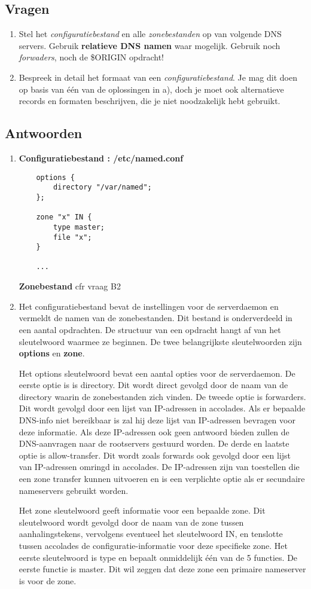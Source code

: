 \documentclass{report}
\begin{document}
\subsection{Vragen}
\begin{enumerate}
\item Stel het \textit{configuratiebestand} en alle \textit{zonebestanden} op van volgende DNS servers. Gebruik \textbf{relatieve DNS namen} waar mogelijk. Gebruik noch \textit{forwaders}, noch de \$ORIGIN opdracht!
\item Bespreek in detail het formaat van een \textit{configuratiebestand}. Je mag dit doen op basis van één van de oplossingen in a), doch je moet ook alternatieve records en formaten beschrijven, die je niet noodzakelijk hebt gebruikt.
\end{enumerate}
\subsection{Antwoorden}
\begin{enumerate}
\item {
	\textbf{Configuratiebestand : /etc/named.conf}
	\begin{lstlisting}
	options {
		directory "/var/named";
	};
	
	zone "x" IN {
		type master;
		file "x";
	}
	
	...
	\end{lstlisting}
	\textbf{Zonebestand} cfr vraag B2
}
\item {
	Het configuratiebestand bevat de instellingen voor de serverdaemon en vermeldt de namen van de zonebestanden. Dit bestand is onderverdeeld in een aantal opdrachten. De structuur van een opdracht hangt af van het sleutelwoord waarmee ze beginnen. De twee belangrijkste sleutelwoorden zijn \textbf{options} en \textbf{zone}.
	
	Het options sleutelwoord bevat een aantal opties voor de serverdaemon. De eerste optie is is directory. Dit wordt direct gevolgd door de naam van de directory waarin de zonebestanden zich vinden. De tweede optie is forwarders. Dit wordt gevolgd door een lijst van IP-adressen in accolades. Als er bepaalde DNS-info niet bereikbaar is zal hij deze lijst van IP-adressen bevragen voor deze informatie. Als deze IP-adressen ook geen antwoord bieden zullen de DNS-aanvragen naar de rootservers gestuurd worden. De derde en laatste optie is allow-transfer. Dit wordt zoals forwards ook gevolgd door een lijst van IP-adressen omringd in accolades. De IP-adressen zijn van toestellen die een zone transfer kunnen uitvoeren en is een verplichte optie als er secundaire nameservers gebruikt worden. 
	
	Het zone sleutelwoord geeft informatie voor een bepaalde zone. Dit sleutelwoord wordt gevolgd door de naam van de zone tussen aanhalingstekens, vervolgens eventueel het sleutelwoord IN, en tenslotte tussen accolades de configuratie-informatie voor deze specifieke zone. Het eerste sleutelwoord is type en bepaalt onmiddelijk één van de 5 functies. De eerste functie is master. Dit wil zeggen dat deze zone een primaire nameserver is voor de zone. 
}
\end{enumerate}
\end{document}
